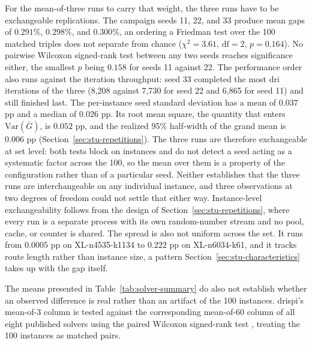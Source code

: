 For the mean-of-three runs to carry that weight, the three runs have to be exchangeable replications. The campaign seeds 11, 22, and 33 produce mean gaps of $0.291\%$, $0.298\%$, and $0.300\%$, an ordering a Friedman test \citep{friedmanUseRanksAvoid1937} over the 100 matched triples does not
separate from chance ($\chi^2 = 3.61$, $\mathrm{df} = 2$, $p = 0.164$). No
pairwise Wilcoxon signed-rank test \citep{wilcoxonIndividualComparisonsRanking1945} between any two seeds reaches significance
either, the smallest $p$ being $0.158$ for seeds 11 against 22. The performance order
also runs against the iteration throughput: seed 33 completed the most \gls{dri} iterations of the three (8,208 against 7,730 for seed 22 and 6,865 for seed 11) and still finished last. The per-instance seed standard deviation has
a mean of $0.037$ pp and a median of $0.026$ pp. Its root mean square, the
quantity that enters $\mathrm{Var}(\bar{G})$, is $0.052$ pp, and the realized
95\% half-width of the grand mean is $0.006$ pp
(Section~\ref{sec:stu-repetitions}). The three runs are therefore exchangeable at set level: both tests block on
instances and do not detect a seed acting as a systematic factor across the 100,
so the mean over them is a property of the configuration rather than of a
particular seed. Neither establishes that the three runs are interchangeable
on any individual instance, and three observations at two degrees of freedom
could not settle that either way. Instance-level exchangeability follows from
the design of Section~\ref{sec:stu-repetitions}, where every run is a separate
process with its own random-number stream and no pool, cache, or counter is
shared. The spread is also not uniform across the set. It runs from $0.0005$ pp
on XL-n4535-k1134 to $0.222$ pp on XL-n6034-k61, and it tracks route length
rather than instance size, a pattern Section~\ref{sec:stu-characteristics}
takes up with the gap itself.

The means presented in Table~\ref{tab:solver-summary} do also not establish whether an
observed difference is real rather than an artifact of the 100 
instances. \gls{drispi}'s mean-of-3 column is tested against the corresponding
mean-of-60 column of all eight published solvers using the paired Wilcoxon signed-rank test
\citep{wilcoxonIndividualComparisonsRanking1945,demsVarStatisticalComparisonsClassifiers}, treating the 100 instances as matched pairs.

